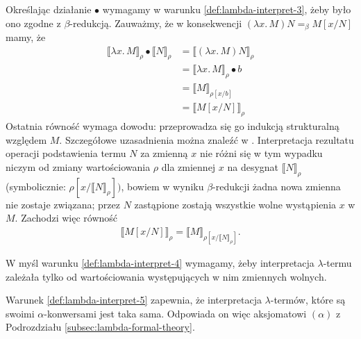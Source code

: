 Określając działanie \(\bullet\) wymagamy w warunku \ref{def:lambda-interpret-3}, żeby było ono zgodne z \(\beta\)-redukcją. Zauważmy, że w konsekwencji \((\lambda x.\,M) N =_\beta M[x/N]\) mamy, że
\begin{align*}
  \llbracket \lambda x.\,M \rrbracket_\rho \bullet \llbracket N \rrbracket_\rho 
    &= \llbracket (\lambda x.\,M) N\rrbracket_\rho \\
    &= \llbracket \lambda x.\,M \rrbracket_\rho \bullet b \\
    &= \llbracket M \rrbracket_{\rho[x/b]} \\
    &= \llbracket M[x/N] \rrbracket_\rho\tag{\dagger}\label{eq:abstraction-to-substitution-in-model}
\end{align*}
Ostatnia równość wymaga dowodu: przeprowadza się go indukcją strukturalną względem \(M\). Szczegółowe uzasadnienia można znaleźć w \cite[Tw. 15.10(a)]{Hindley:2008:LCI:1388400}. Interpretacja rezultatu operacji podstawienia termu \(N\) za zmienną \(x\) nie różni się w tym wypadku niczym od zmiany wartościowania \(\rho\) dla zmiennej \(x\) na desygnat \(\llbracket N\rrbracket_\rho\) (symbolicznie: \(\rho[x/\llbracket N \rrbracket_\rho])\), bowiem w wyniku \(\beta\)-redukcji żadna nowa zmienna nie zostaje związana; przez \(N\) zastąpione zostają wszystkie wolne wystąpienia \(x\) w \(M\). Zachodzi więc równość
\begin{align*}
  \llbracket M[x/N] \rrbracket_\rho = \llbracket M \rrbracket_{\rho[x/\llbracket N \rrbracket_\rho]}.
\end{align*}

W myśl warunku \ref{def:lambda-interpret-4} wymagamy, żeby interpretacja \(\lambda\)-termu zależała tylko od wartościowania występujących w nim zmiennych wolnych. 

Warunek \ref{def:lambda-interpret-5} zapewnia, że interpretacja \(\lambda\)-termów, które są swoimi \(\alpha\)-konwersami jest taka sama. Odpowiada on więc aksjomatowi \((\alpha)\) z Podrozdziału \ref{subsec:lambda-formal-theory}.

  
